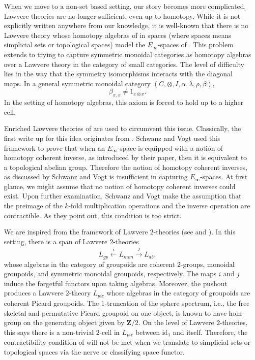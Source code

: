 \documentclass{tac}
\begin{document}
When we move to a non-set based setting, our story becomes more complicated. Lawvere theories are no longer sufficient, even up to homotopy. While it is not explicitly written anywhere from our knowledge, it is well-known that there is no Lawvere theory whose homotopy algebras of \cite{bern1} in spaces (where spaces means simplicial sets or topological spaces) model the $E_\infty$-spaces of \cite{May2}. This problem extends to trying to capture symmetric monoidal categories as homotopy algebras over a Lawvere theory in the category of small categories. The level of difficulty lies in the way that the symmetry isomorphisms interacts with the diagonal maps. In a general symmetric monoidal category $(C,\otimes, I,\alpha,\lambda,\rho,\beta)$, 
\[
\beta_{x,x}\neq 1_{x\otimes x}.
\]
In the setting of homotopy algebras, this axiom is forced to hold up to a higher cell.

Enriched Lawvere theories of \cite{BaezWilliams2020} are used to circumvent this issue. Classically, the first write up for this idea originates from \cite{SchwanzlVogt1989}. Schwanz and Vogt used this framework to prove that when an $E_\infty$-space is equipped with a notion of homotopy coherent inverse, as introduced by their paper, then it is equivalent to a topological abelian group. Therefore the notion of homotopy coherent inverses, as discussed by Schwanz and Vogt is insufficient in capturing $E_\infty$-spaces. At first glance, we might assume that no notion of homotopy coherent inverses could exist.  Upon further examination, Schwanz and Vogt make the assumption that the preimage of the $k$-fold multiplication operations and the inverse operation are contractible. As they point out, this condition is too strict.

We are inspired from the framework of Lawvere $2$-theories (see \cite{Perutka2026} and \cite{yan1}). In this setting, there is a span of Lawvere $2$-theories
\[
L_{gp}\xleftarrow{i}L_{mon}\xrightarrow{j}L_{ab},
\]
whose algebras in the category of groupoids are coherent $2$-groups, monoidal groupoids, and symmetric monoidal groupoids, respectively. The maps $i$ and $j$ induce the forgetful functors upon taking algebras. Moreover, the pushout produces a Lawvere $2$-theory $L_{pic}$ whose algebras in the category of groupoids are coherent Picard groupoids. The $1$-truncation of the sphere spectrum, i.e., the free skeletal and permutative Picard groupoid on one object, is known to have hom-group on the generating object given by $\mathbf{Z}/2$. On the level of Lawvere $2$-theories, this says there is a non-trivial $2$-cell in $L_{pic}$ between $\text{id}_1$ and itself. Therefore, the contractibility condition of \cite{SchwanzlVogt1989} will not be met when we translate to simplicial sets or topological spaces via the nerve or classifying space functor. 
\end{document}
